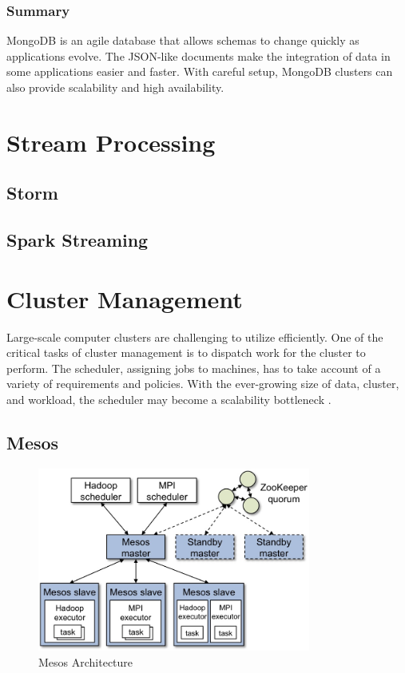 \documentclass[11pt]{book}
\begin{document}
\subsection{Summary}
MongoDB is an agile database that allows schemas to change quickly as applications evolve. The JSON-like documents make the integration of data in some applications easier and faster. With careful setup, MongoDB clusters can also provide scalability and high availability.

\chapter[Stream Processing]
{Stream Processing}

\section{Storm}

\section{Spark Streaming}


\chapter{Cluster Management}
Large-scale computer clusters are challenging to utilize efficiently. One of the critical tasks of cluster management is to dispatch work for the cluster to perform. The scheduler, assigning jobs to machines, has to take account of a variety of requirements and policies. With the ever-growing size of data, cluster, and workload, the scheduler may become a scalability bottleneck \cite{Schwarzkopf:2013:OFS}.

\section[Mesos]
{Mesos}
\begin{figure}[t]
\includegraphics[width=0.8\textwidth]{images/mesos-architecture.jpg}
\centering
\caption{Mesos Architecture}
\end{figure}
\end{document}
